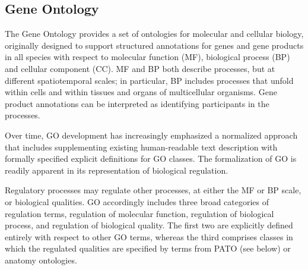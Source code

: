 \documentclass{bioinfo}
\renewcommand{\cite}{\citep}
\begin{document}
\begin{methods}


\subsection{Gene Ontology}
The Gene Ontology provides a set of ontologies for molecular and
cellular biology, originally designed to support structured
annotations for genes and gene products in all species with respect to
molecular function (MF), biological process (BP) and cellular
component (CC). MF and BP both describe processes, but at different
spatiotemporal scales; in particular, BP includes processes that
unfold within cells and within tissues and organs of multicellular
organisms. Gene product annotations can be interpreted as identifying
participants in the processes.

Over time, GO development has increasingly emphasized a normalized
approach that includes supplementing existing human-readable text
description with formally specified explicit definitions for GO
classes. The formalization of GO is readily apparent in its
representation of biological regulation.

Regulatory processes may regulate other processes, at either the MF or
BP scale, or biological qualities. GO accordingly includes three broad
categories of regulation terms, regulation of molecular function,
regulation of biological process, and regulation of biological
quality. The first two are explicitly defined entirely with respect to
other GO terms, whereas the third comprises classes in which the
regulated qualities are specified by terms from PATO (see below) or
anatomy ontologies.


\end{methods}
\end{document}
